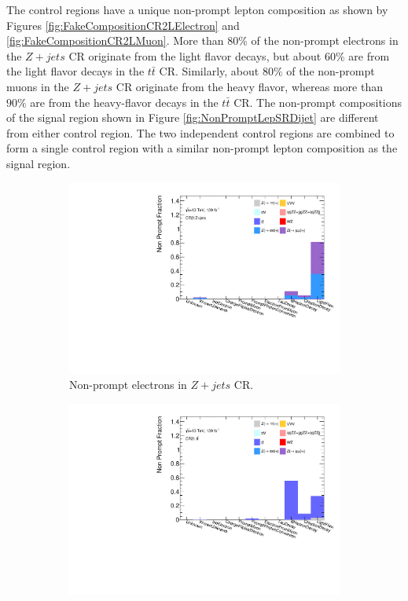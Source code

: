The control regions have a unique non-prompt lepton composition as shown by Figures \ref{fig:FakeCompositionCR2LElectron} and \ref{fig:FakeCompositionCR2LMuon}. More than $80\%$ of the non-prompt electrons in the $Z+jets$ CR originate from the light flavor decays, but about $60\%$ are from the light flavor decays in the $t\bar{t}$ CR. Similarly, about $80\%$ of the non-prompt muons in the $Z+jets$ CR originate from the heavy flavor, whereas more than $90\%$ are from the heavy-flavor decays in the $t\bar{t}$ CR. The non-prompt compositions of the signal region shown in Figure \ref{fig:NonPromptLepSRDijet} are different from either control region. The two independent control regions are combined to form a single control region with a similar non-prompt lepton composition as the signal region.

\begin{figure}[ht]
    \begin{subfigure}{.48\textwidth}
      \centering
      \includegraphics[width=.9\linewidth]{figures/Analysis/Background/NonPromptComposition_ZplusX_Electrons.pdf}  
      \caption{Non-prompt electrons in $Z+jets$ CR.}
    \end{subfigure}
    \begin{subfigure}{.48\textwidth}
      \centering
      \includegraphics[width=.9\linewidth]{figures/Analysis/Background/NonPromptComposition_ttbar_Electrons.pdf}

\end{subfigure}
\end{figure}
